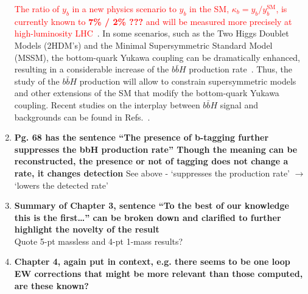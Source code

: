 \documentclass[main.tex]{subfiles}
\begin{document}
\begin{enumerate}
\textcolor{red}{The ratio of $y_b$ in a new physics scenario to $y_b$ in the SM, $\kappa_b = y_b / y_b^{\text{SM}}$, is currently known to \textbf{7\% / 2\% ???} and will be measured more precisely at high-luminosity LHC~\cite{Cepeda:2019klc, 2019369}}. In some scenarios, such as the Two Higgs Doublet Models (2HDM's) and the Minimal
Supersymmetric Standard Model (MSSM), the bottom-quark Yukawa coupling can be dramatically enhanced,
resulting in a considerable increase of the $b\bar{b}H$ production
rate~\cite{Balazs:1998nt,Dawson:2005vi}.  Thus, the study of the $b\bar{b}H$ production will allow
to constrain supersymmetric models and other extensions of the SM that modify the bottom-quark
Yukawa coupling. Recent studies on the interplay between $b\bar{b}H$ signal and backgrounds can be
found in Refs.~\cite{Pagani:2020rsg,Grojean:2020ech,Konar:2021nkk}.
\item \textbf{Pg. 68 has the sentence “The presence of b-tagging further suppresses the bbH
production rate” Though the meaning can be reconstructed, the presence or not of
tagging does not change a rate, it changes detection}
See above - `suppresses the production rate' $\rightarrow$ `lowers the detected rate'

\item \textbf{Summary of Chapter 3, sentence “To the best of our knowledge this is the first…”
can be broken down and clarified to further highlight the novelty of the result}
\\
Quote 5-pt massless and 4-pt 1-mass results?

\item \textbf{Chapter 4, again put in context, e.g. there seems to be one loop EW corrections
that might be more relevant than those computed, are these known?}


\end{enumerate}
\end{document}
